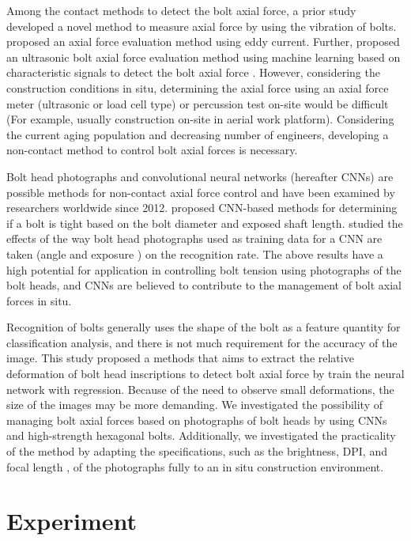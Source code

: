\documentclass{proc-a4}
\begin{document}
Among the contact methods to detect the bolt axial force, \citep{Toh2019DeterminationProcess} a prior study developed a novel method to measure axial force by using the vibration of bolts. \citep{Akutsu2022AdvancementBoltsb} proposed an axial force evaluation method using eddy current. Further, \citep{Hirao2022ProposalProcessing} proposed an ultrasonic bolt axial force evaluation method using machine learning based on characteristic signals to detect the bolt axial force . However, considering the construction conditions in situ, determining the axial force using an axial force meter (ultrasonic or load cell type) or percussion test on-site would be difficult (For example, usually construction on-site in aerial work platform). Considering the current aging population and decreasing number of engineers, developing a non-contact method to control bolt axial forces is necessary.

Bolt head photographs and convolutional neural networks (hereafter CNNs) are possible methods for non-contact axial force control and have been examined by researchers worldwide since 2012. \citep{Ramana2019FullyAlgorithm, Huynh2019Quasi-autonomousProcessing} proposed CNN-based methods for determining if a bolt is tight based on the bolt diameter and exposed shaft length. \citep{Zhao2019BoltLearning} studied the effects of the way bolt head photographs used as training data for a CNN are taken (angle and exposure ) on the recognition rate. The above results have a high potential for application in controlling bolt tension using photographs of the bolt heads, and CNNs are believed to contribute to the management of bolt axial forces in situ.

Recognition of bolts generally uses the shape of the bolt as a feature quantity for classification analysis, and there is not much requirement for the accuracy of the image. This study proposed a methods that aims to extract the relative deformation of bolt head inscriptions to detect bolt axial force by train the neural network with regression. Because of the need to observe small deformations, the size of the images may be more demanding. We investigated the possibility of managing bolt axial forces based on photographs of bolt heads by using CNNs and high-strength hexagonal bolts.  Additionally, we investigated the practicality of the method by adapting the specifications, such as the brightness, DPI, and focal length , of the photographs fully to an in situ construction environment.

\section{Experiment}
\end{document}
